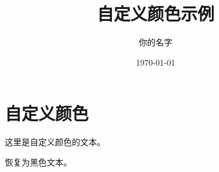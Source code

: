 \documentclass[a4paper,12pt]{ctexart}
\title{自定义颜色示例}
\author{你的名字}
\date{\today}
\begin{document}
\maketitle

\section{自定义颜色}

\color{mycolor} 这里是自定义颜色的文本。

\color{black} 恢复为黑色文本。
\end{document}
